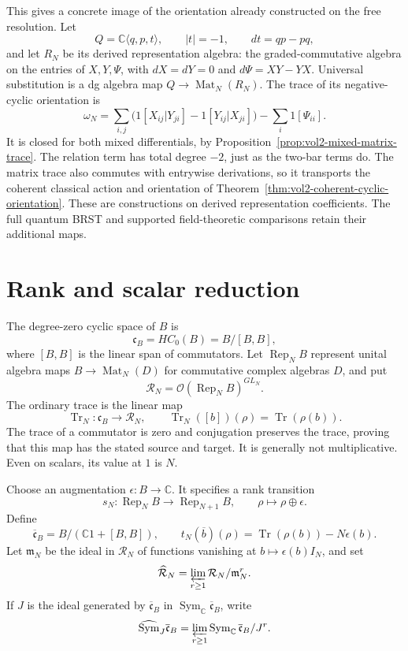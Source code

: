 This gives a concrete image of the orientation already
constructed on the free resolution.
Let
\[
 Q=\mathbb C\langle q,p,t\rangle,\qquad
 |t|=-1,\qquad dt=qp-pq,
\]
and let $R_N$ be its derived representation algebra:
the graded-commutative algebra on the entries of $X,Y,\Psi$,
with
$dX=dY=0$ and $d\Psi=XY-YX$.
Universal substitution is a dg algebra map
$Q\to\operatorname{Mat}_N(R_N)$.
The trace of its negative-cyclic orientation is
\begin{equation}\label{eq:vol2-traced-orientation}
 \omega_N=
 \sum_{i,j}
 \bigl(1[X_{ij}|Y_{ji}]-1[Y_{ij}|X_{ji}]\bigr)
 -\sum_i1[\Psi_{ii}].
\end{equation}
It is closed for both mixed differentials, by
Proposition~\ref{prop:vol2-mixed-matrix-trace}.
The relation term has total degree $-2$, just as the
two-bar terms do.
The matrix trace also commutes with entrywise derivations,
so it transports the coherent classical action and
orientation of
Theorem~\ref{thm:vol2-coherent-cyclic-orientation}.
These are constructions on derived representation
coefficients. The full quantum BRST and supported
field-theoretic comparisons retain their additional maps.

\section{Rank and scalar reduction}
\label{sec:vol2-reduced-stable-trace}

The degree-zero cyclic space of $B$ is
\[
 \mathfrak c_B=HC_0(B)=B/[B,B],
\]
where $[B,B]$ is the linear span of commutators.
Let $\operatorname{Rep}_NB$ represent unital algebra maps
$B\to\operatorname{Mat}_N(D)$ for commutative complex
algebras $D$, and put
\[
 \mathcal R_N=\mathcal O(\operatorname{Rep}_NB)^{GL_N}.
\]
The ordinary trace is the linear map
\[
 \operatorname{Tr}_N:\mathfrak c_B\longrightarrow\mathcal R_N,
 \qquad
 \operatorname{Tr}_N([b])(\rho)=\operatorname{Tr}(\rho(b)).
\]
The trace of a commutator is zero and conjugation preserves
the trace, proving that this map has the stated source
and target. It is generally not multiplicative.
Even on scalars, its value at $1$ is $N$.

Choose an augmentation $\epsilon:B\to\mathbb C$.
It specifies a rank transition
\[
 s_N:\operatorname{Rep}_NB\longrightarrow\operatorname{Rep}_{N+1}B,
 \qquad \rho\longmapsto\rho\oplus\epsilon.
\]
Define
\[
 \overline{\mathfrak c}_B=B/(\mathbb C1+[B,B]),
 \qquad
 t_N(\overline b)(\rho)=\operatorname{Tr}(\rho(b))-N\epsilon(b).
\]
Let $\mathfrak m_N$ be the ideal in $\mathcal R_N$ of functions
vanishing at $b\mapsto\epsilon(b)I_N$, and set
\[
 \widehat{\mathcal R}_N
   =\varprojlim_{r\geq1}\mathcal R_N/\mathfrak m_N^r.
\]
If $J$ is the ideal generated by
$\overline{\mathfrak c}_B$ in
$\operatorname{Sym}_{\mathbb C}\overline{\mathfrak c}_B$,
write
\[
 \widehat{\operatorname{Sym}}_J\overline{\mathfrak c}_B
 =\varprojlim_{r\geq1}
   \operatorname{Sym}_{\mathbb C}\overline{\mathfrak c}_B/J^r.
\]

